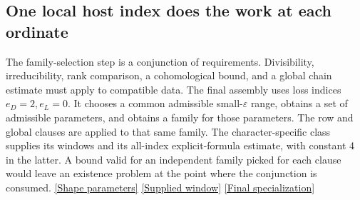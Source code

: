 \documentclass[12pt,letterpaper]{article}
\begin{document}
\subsection{One local host index does the work at each ordinate}
The family-selection step is a conjunction of requirements. Divisibility, irreducibility, rank comparison, a cohomological bound, and a global chain estimate must apply to compatible data. The final assembly uses loss indices \(e_D=2,e_L=0\). It chooses a common admissible small-\(\varepsilon\) range, obtains a set of admissible parameters, and obtains a family for those parameters. The row and global clauses are applied to that same family. The character-specific class supplies its windows and its all-index explicit-formula estimate, with constant 4 in the latter. A bound valid for an independent family picked for each clause would leave an existence problem at the point where the conjunction is consumed. \href{https://github.com/nousentllc/riemann-hypothesis/blob/40e56bab026552e089d7afcfeff08d2defb9c005/src/Development/AutomorphicArithmetic/ThetaCorrespondence/ThetaPairLifts/ThirdPlaceSeries/TopShape.lean#L47-L55}{\textsf{[Shape parameters]}} \href{https://github.com/nousentllc/riemann-hypothesis/blob/40e56bab026552e089d7afcfeff08d2defb9c005/src/Development/AutomorphicArithmetic/CharacterBoxes/DesWin.lean#L11-L31}{\textsf{[Supplied window]}} \href{https://github.com/nousentllc/riemann-hypothesis/blob/40e56bab026552e089d7afcfeff08d2defb9c005/src/Development/AutomorphicArithmetic/CharacterBoxes/ZeroFreeAllOfTopG.lean#L16-L33}{\textsf{[Final specialization]}}
\end{document}
